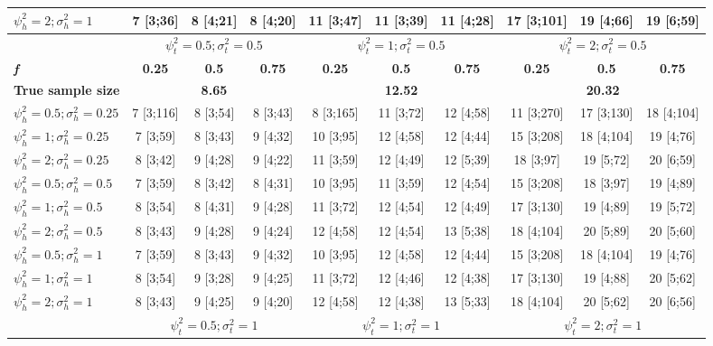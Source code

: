 \documentclass[AMA,STIX1COL,]{WileyNJD-v2}
\begin{document}
\begin{table}[ht]
{\begin{tabular}{l c c c c c c c c c}
$\psi_h^2 = 2; \sigma_h^2 = 1$ & 7 [3;36] & 8 [4;21] & 8 [4;20] & 11 [3;47] & 11 [3;39] & 11 [4;28] & 17 [3;101] & 19 [4;66] & 19 [6;59] \\
\hline 
 & \multicolumn{3}{c}{$\psi_t^2 = 0.5; \sigma_t^2 = 0.5$} & \multicolumn{3}{c}{$\psi_t^2 = 1; \sigma_t^2 = 0.5$} & \multicolumn{3}{c}{$\psi_t^2= 2; \sigma_t^2 = 0.5$} \\
\addlinespace[1pt]
\cmidrule(lr){2-4} \cmidrule(lr){5-7} \cmidrule(lr){8-10}
\textbf{\textit{f}} & \textbf{0.25} & \textbf{0.5} & \textbf{0.75} & \textbf{0.25} & \textbf{0.5} & \textbf{0.75} & \textbf{0.25} & \textbf{0.5} & \textbf{0.75} \\
\hline
\textbf{True sample size} & \multicolumn{3}{c}{\textbf{8.65}} & \multicolumn{3}{c}{\textbf{12.52}} & \multicolumn{3}{c}{\textbf{20.32}} \\
$\psi_h^2 = 0.5; \sigma_h^2 = 0.25$ & 7 [3;116] & 8 [3;54] & 8 [3;43] & 8 [3;165] & 11 [3;72] & 12 [4;58] & 11 [3;270] & 17 [3;130] & 18 [4;104] \\
$\psi_h^2 = 1; \sigma_h^2 = 0.25$ & 7 [3;59] & 8 [3;43] & 9 [4;32] & 10 [3;95] & 12 [4;58] & 12 [4;44] & 15 [3;208] & 18 [4;104] & 19 [4;76] \\
$\psi_h^2 = 2; \sigma_h^2 = 0.25$ & 8 [3;42] & 9 [4;28] & 9 [4;22] & 11 [3;59] & 12 [4;49] & 12 [5;39] & 18 [3;97] & 19 [5;72] & 20 [6;59] \\
$\psi_h^2 = 0.5; \sigma_h^2 = 0.5$ & 7 [3;59] & 8 [3;42] & 8 [4;31] & 10 [3;95] & 11 [3;59] & 12 [4;54] & 15 [3;208] & 18 [3;97] & 19 [4;89] \\
$\psi_h^2 = 1; \sigma_h^2 = 0.5$ & 8 [3;54] & 8 [4;31] & 9 [4;28] & 11 [3;72] & 12 [4;54] & 12 [4;49] & 17 [3;130] & 19 [4;89] & 19 [5;72] \\
$\psi_h^2 = 2; \sigma_h^2 = 0.5$ & 8 [3;43] & 9 [4;28] & 9 [4;24] & 12 [4;58] & 12 [4;54] & 13 [5;38] & 18 [4;104] & 20 [5;89] & 20 [5;60] \\
$\psi_h^2 = 0.5; \sigma_h^2 = 1$ & 7 [3;59] & 8 [3;43] & 9 [4;32] & 10 [3;95] & 12 [4;58] & 12 [4;44] & 15 [3;208] & 18 [4;104] & 19 [4;76] \\
$\psi_h^2 = 1; \sigma_h^2 = 1$ & 8 [3;54] & 9 [3;28] & 9 [4;25] & 11 [3;72] & 12 [4;46] & 12 [4;38] & 17 [3;130] & 19 [4;88] & 20 [5;62] \\
$\psi_h^2 = 2; \sigma_h^2 = 1$ & 8 [3;43] & 9 [4;25] & 9 [4;20] & 12 [4;58] & 12 [4;38] & 13 [5;33] & 18 [4;104] & 20 [5;62] & 20 [6;56] \\
\hline 
 & \multicolumn{3}{c}{$\psi_t^2 = 0.5; \sigma_t^2 = 1$} & \multicolumn{3}{c}{$\psi_t^2 = 1; \sigma_t^2 = 1$} & \multicolumn{3}{c}{$\psi_t^2 = 2; \sigma_t^2 = 1$} \\

\end{tabular}}
\end{table}
\end{document}
